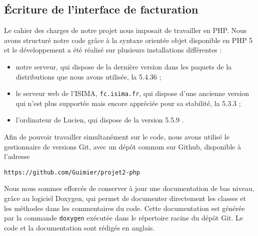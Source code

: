 \subsection{Écriture de l’interface de facturation}

Le cahier des charges de notre projet nous imposait de travailler en PHP. Nous avons structuré notre code grâce à la syntaxe orientée objet disponible en PHP 5 et le développement a été réalisé sur plusieurs installations différentes :
\begin{itemize}
	\item notre serveur, qui dispose de la dernière version dans les paquets de la distributions que nous avons utilisée, la 5.4.36 ;
	\item le serveur web de l’ISIMA, \texttt{fc.isima.fr}, qui dispose d’une ancienne version qui n’est plus supportée mais encore appréciée pour sa stabilité, la 5.3.3 ;
	\item l’ordinateur de Lucien, qui dispose de la version 5.5.9 .
\end{itemize}

Afin de pouvoir travailler simultanément sur le code, nous avons utilisé le gestionnaire de versions Git, avec un dépôt commun sur Github, disponible à l’adresse
\begin{verbatim}
https://github.com/Guimier/projet2-php
\end{verbatim}

Nous nous sommes efforcés de conserver à jour une documentation de bas niveau, grâce au logiciel Doxygen, qui permet de documenter directement les classes et les méthodes dans les commentaires du code. Cette documentation est générée par la commande \texttt{doxygen} exécutée dans le répertoire racine du dépôt Git. Le code et la documentation sont rédigés en anglais.
